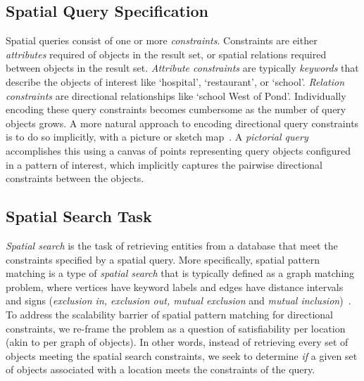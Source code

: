 \subsection{Spatial Query Specification}
\par{
    Spatial queries consist of one or more \textit{constraints}.
    Constraints are either \textit{attributes} required of objects in the result set, or spatial relations required between objects in the result set.
%
    \textit{Attribute constraints} are typically \textit{keywords} that describe the objects of interest like `hospital', `restaurant', or `school'.
    \textit{Relation constraints} are directional relationships like `school West of Pond'.
    Individually encoding these query constraints becomes cumbersome as the number of query objects grows.
    A more natural approach to encoding directional query constraints is to do so implicitly, with a picture or sketch map~\cite{Osul2023}.
    A \textit{pictorial query} accomplishes this using a canvas of points representing query objects configured in a pattern of interest, which implicitly captures the pairwise directional constraints between the objects. 
    
}


\subsection{Spatial Search Task}
\par{
    \textit{Spatial search} is the task of retrieving entities from a database that meet the constraints specified by a spatial query.
    More specifically, spatial pattern matching is a type of \textit{spatial search} that is typically defined as a graph matching problem, where vertices have keyword labels and edges have distance intervals and signs (\textit{exclusion in, exclusion out, mutual exclusion} and \textit{mutual inclusion})~\cite{Fang2019}.
    To address the scalability barrier of spatial pattern matching for directional constraints, we re-frame the problem as a question of satisfiability per location (akin to per graph of objects).
    In other words, instead of retrieving every set of objects meeting the spatial search constraints, we seek to determine \emph{if} a given set of objects associated with a location meets the constraints of the query.
}








